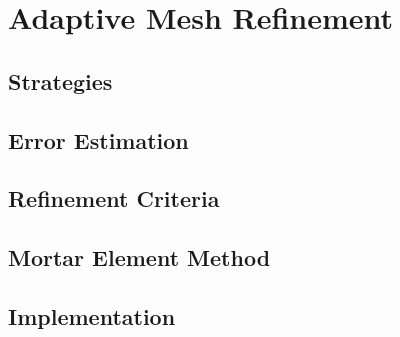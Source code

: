 \chapter{Adaptive Mesh Refinement} \label{chapter:adaptive_mesh_refinement} 

\section{Strategies} \label{section:adaptive_mesh_refinement:adaptivity_strategies}

\section{Error Estimation} \label{section:adaptive_mesh_refinement:error_estimation}

\section{Refinement Criteria} \label{section:adaptive_mesh_refinement:refinement_criteria}

\section{Mortar Element Method} \label{section:adaptive_mesh_refinement:mortar_element_method}

\section{Implementation} \label{section:adaptive_mesh_refinement:implementation}